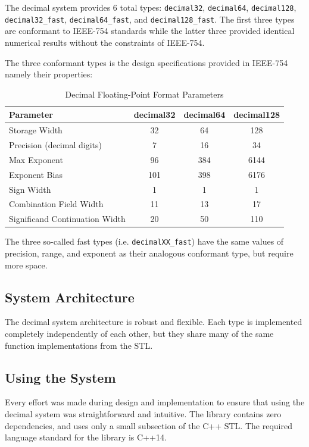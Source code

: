 \documentclass[acmsmall]{acmart}
\newcommand{\code}[1]{\texttt{#1}}
\begin{document}
The decimal system provides 6 total types: \code{decimal32}, \code{decimal64}, \code{decimal128}, \code{decimal32\_fast}, \code{decimal64\_fast}, and \code{decimal128\_fast}.
The first three types are conformant to IEEE-754 standards while the latter three provided identical numerical results without the constraints of IEEE-754.

The three conformant types is  the design specifications provided in IEEE-754 namely their properties:

\begin{table}[t]
\centering
\begin{tabular}{|l|c|c|c|}
\hline
\textbf{Parameter} & \textbf{decimal32} & \textbf{decimal64} & \textbf{decimal128} \\
\hline
Storage Width & 32 & 64 & 128 \\
\hline
Precision (decimal digits) & 7 & 16 & 34 \\
\hline
Max Exponent & 96 & 384 & 6144 \\
\hline
Exponent Bias & 101 & 398 & 6176 \\
\hline
Sign Width & 1 & 1 & 1 \\
\hline
Combination Field Width & 11 & 13 & 17 \\
\hline
Significand Continuation Width & 20 & 50 & 110 \\
\hline
\end{tabular}
\caption{Decimal Floating-Point Format Parameters}
\label{tab:decimal_params}
\end{table}

The three so-called fast types (i.e. \code{decimalXX\_fast}) have the same values of precision, range, and exponent as their analogous conformant type, but require more space.

\subsection{System Architecture}

The decimal system architecture is robust and flexible.
Each type is implemented completely independently of each other, but they share many of the same function implementations from the STL.

\subsection{Using the System}

Every effort was made during design and implementation to ensure that using the decimal system was straightforward and intuitive.
The library contains zero dependencies, and uses only a small subsection of the C++ STL.
The required language standard for the library is C++14.
\end{document}
